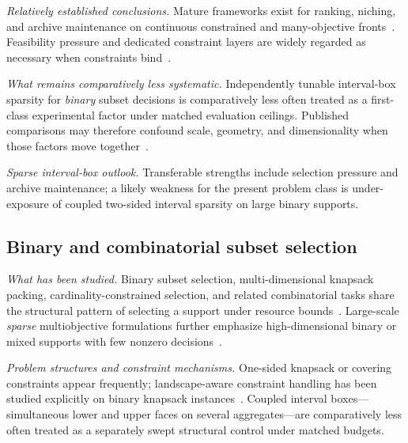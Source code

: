 \documentclass[lettersize,journal]{IEEEtran}
\begin{document}
\emph{Relatively established conclusions.}
Mature frameworks exist for ranking, niching, and archive maintenance on continuous constrained and many-objective fronts~\cite{deb2002,zhang2007,cheng2016,zitzler2001}.
Feasibility pressure and dedicated constraint layers are widely regarded as necessary when constraints bind~\cite{yu2024adualpopulationc9fb6,kan2017aconstrainedmult6073}.

\emph{What remains comparatively less systematic.}
Independently tunable interval-box sparsity for \emph{binary} subset decisions is comparatively less often treated as a first-class experimental factor under matched evaluation ceilings.
Published comparisons may therefore confound scale, geometry, and dimensionality when those factors move together~\cite{deb2002,zhang2007,cheng2016,qiao2024evolutionaryconsfb48}.

\emph{Sparse interval-box outlook.}
Transferable strengths include selection pressure and archive maintenance; a likely weakness for the present problem class is under-exposure of coupled two-sided interval sparsity on large binary supports.

\subsection{Binary and combinatorial subset selection}
\emph{What has been studied.}
Binary subset selection, multi-dimensional knapsack packing, cardinality-constrained selection, and related combinatorial tasks share the structural pattern of selecting a support under resource bounds~\cite{bai2026arandomforestgui6cda,liefooghe2023adaptivelandscapdb6a,aishwaryaprajna2023evolutionaryande6e82,gu2024subsetselectionf5654,falcncardona2026fasthighdiversitb480}.
Large-scale \emph{sparse} multiobjective formulations further emphasize high-dimensional binary or mixed supports with few nonzero decisions~\cite{tian2020anevolutionaryalaac9,yang2025asparselargescal6a1f,shao2026generativemodelb2427,wang2026aheterogeneouspoba62,chen2023anevolutionaryal105f,jarrah2024theevolutionarya33da}.

\emph{Problem structures and constraint mechanisms.}
One-sided knapsack or covering constraints appear frequently; landscape-aware constraint handling has been studied explicitly on binary knapsack instances~\cite{liefooghe2023adaptivelandscapdb6a}.
Coupled interval boxes---simultaneous lower and upper faces on several aggregates---are comparatively less often treated as a separately swept structural control under matched budgets.
\end{document}
